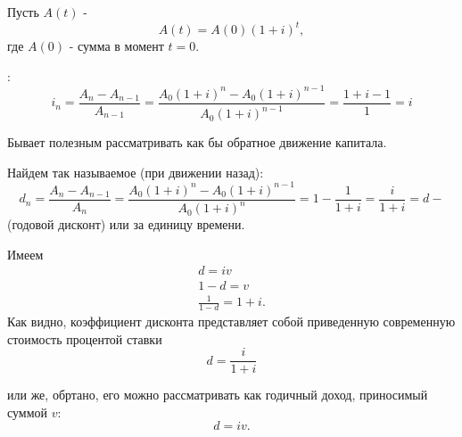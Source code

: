 \begin{mindanddef}
	Пусть $ A(t)$ - 
	\[ A(t) = A(0)(1+i)^t, \]
	где $ A(0)$ - сумма в момент $ t = 0$.

	:
	\[ i_n = \frac{A_n - A_{n-1}}{A_{n-1}} = \frac{A_0(1+i)^n-A_0(1+i)^{n-1}}{A_0(1+i)^{n-1}} = \frac{1+i-1}{1} = i  \]

	Бывает полезным рассматривать как бы обратное движение капитала.

	Найдем так называемое (при движении назад):
	 \[ d_n = \frac{A_n - A_{n-1}}{A_n} = \frac{A_0(1+i)^n-A_0(1+i)^{n-1}}{A_0(1+i)^{n}} = 1 - \frac{1}{1+i} = \frac{i}{1+i} = d- \]
	 (годовой дисконт) или  за единицу времени.

	 Имеем
	 \begin{gather*}
	 	d = iv\\
	 	1 -d = v\\
	 	\frac{1}{1-d} = 1+i.
	 \end{gather*}
	Как видно, коэффициент дисконта представляет собой приведенную современную стоимость процентой ставки
	\[ d = \frac{i}{1+i} \]

	 или же, обртано, его можно рассматривать как годичный доход, приносимый суммой $ v$:
	 \[ d = iv. \]
\end{mindanddef}

